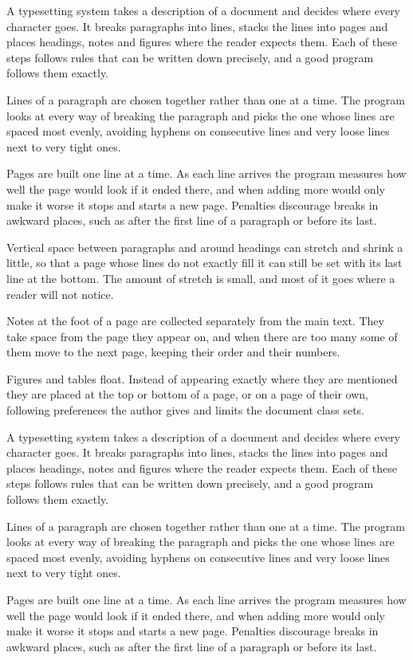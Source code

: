 \documentclass{article}
\begin{document}
A typesetting system takes a description of a document and decides where every character goes. It breaks paragraphs into lines, stacks the lines into pages and places headings, notes and figures where the reader expects them. Each of these steps follows rules that can be written down precisely, and a good program follows them exactly.

Lines of a paragraph are chosen together rather than one at a time. The program looks at every way of breaking the paragraph and picks the one whose lines are spaced most evenly, avoiding hyphens on consecutive lines and very loose lines next to very tight ones.

Pages are built one line at a time. As each line arrives the program measures how well the page would look if it ended there, and when adding more would only make it worse it stops and starts a new page. Penalties discourage breaks in awkward places, such as after the first line of a paragraph or before its last.

Vertical space between paragraphs and around headings can stretch and shrink a little, so that a page whose lines do not exactly fill it can still be set with its last line at the bottom. The amount of stretch is small, and most of it goes where a reader will not notice.

Notes at the foot of a page are collected separately from the main text. They take space from the page they appear on, and when there are too many some of them move to the next page, keeping their order and their numbers.

Figures and tables float. Instead of appearing exactly where they are mentioned they are placed at the top or bottom of a page, or on a page of their own, following preferences the author gives and limits the document class sets.

A typesetting system takes a description of a document and decides where every character goes. It breaks paragraphs into lines, stacks the lines into pages and places headings, notes and figures where the reader expects them. Each of these steps follows rules that can be written down precisely, and a good program follows them exactly.

Lines of a paragraph are chosen together rather than one at a time. The program looks at every way of breaking the paragraph and picks the one whose lines are spaced most evenly, avoiding hyphens on consecutive lines and very loose lines next to very tight ones.

Pages are built one line at a time. As each line arrives the program measures how well the page would look if it ended there, and when adding more would only make it worse it stops and starts a new page. Penalties discourage breaks in awkward places, such as after the first line of a paragraph or before its last.
\end{document}
